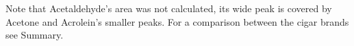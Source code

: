 \documentclass[reprint,amsmath,amssymb,aps, prl]{revtex4-2}
\begin{document}
Note that Acetaldehyde's area was not calculated, its wide peak is covered by Acetone and Acrolein's smaller peaks. For a comparison between the cigar brands see Summary. 


\end{document}
